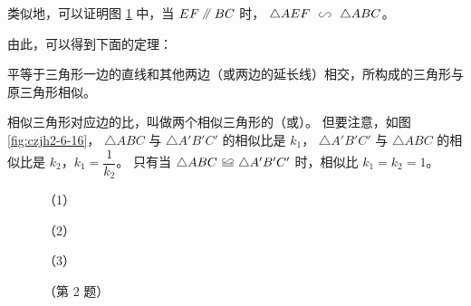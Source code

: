 \begin{enhancedline}
\begin{figure}[htbp]
    \centering
    \begin{minipage}[b]{7cm}
        \centering
        
        \caption{}\label{fig:czjh2-6-17}
    \end{minipage}
    \qquad
    \begin{minipage}[b]{7cm}
        \centering
        
        \caption{}\label{fig:czjh2-6-18}
    \end{minipage}
\end{figure}

类似地，可以证明图 \ref{fig:czjh2-6-18} 中，当 $EF \pingxing BC$ 时， $\triangle AEF \xiangsi \triangle ABC$。

由此，可以得到下面的定理：

\begin{dingli}[定理]
    平等于三角形一边的直线和其他两边（或两边的延长线）相交，所构成的三角形与原三角形相似。
\end{dingli}

相似三角形对应边的比，叫做两个相似三角形的（或）。
但要注意，如图 \ref{fig:czjh2-6-16}， $\triangle ABC$ 与 $\triangle A'B'C'$ 的相似比是 $k_1$，
$\triangle A'B'C'$ 与 $\triangle ABC$ 的相似比是 $k_2$，$k_1 = \dfrac{1}{k_2}$。
只有当 $\triangle ABC \quandeng \triangle A'B'C'$ 时，相似比 $k_1 = k_2 = 1$。


\begin{lianxi}

\xiaoti{}%
\begin{xiaoxiaotis}%


\end{xiaoxiaotis}


\begin{xiaoxiaotis}

\begin{figure}[htbp]
    \centering
    \begin{minipage}[b]{4.5cm}
        \centering
        
        \caption*{（1）}
    \end{minipage}
    \qquad
    \begin{minipage}[b]{4.5cm}
        \centering
        
        \caption*{（2）}
    \end{minipage}
    \qquad
    \begin{minipage}[b]{4.5cm}
        \centering
        
        \caption*{（3）}
    \end{minipage}
    \caption*{（第 2 题）}
\end{figure}


\end{xiaoxiaotis}
\end{lianxi}
\end{enhancedline}
